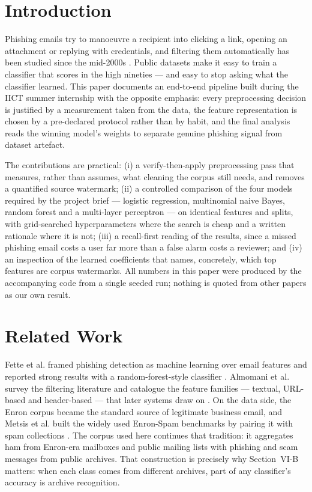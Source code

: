 \documentclass[conference]{IEEEtran}
\begin{document}
\section{Introduction}
Phishing emails try to manoeuvre a recipient into clicking a link,
opening an attachment or replying with credentials, and filtering them
automatically has been studied since the mid-2000s
\cite{fette2007,almomani2013}. Public datasets make it easy to train a
classifier that scores in the high nineties --- and easy to stop asking
what the classifier learned. This paper documents an end-to-end pipeline
built during the IICT summer internship with the opposite emphasis:
every preprocessing decision is justified by a measurement taken from
the data, the feature representation is chosen by a pre-declared
protocol rather than by habit, and the final analysis reads the winning
model's weights to separate genuine phishing signal from dataset
artefact.

The contributions are practical: (i) a verify-then-apply preprocessing
pass that measures, rather than assumes, what cleaning the corpus still
needs, and removes a quantified source watermark; (ii) a controlled
comparison of the four models required by the project brief --- logistic
regression, multinomial naive Bayes, random forest and a multi-layer
perceptron --- on identical features and splits, with grid-searched
hyperparameters where the search is cheap and a written rationale where
it is not; (iii) a recall-first reading of the results, since a missed
phishing email costs a user far more than a false alarm costs a
reviewer; and (iv) an inspection of the learned coefficients that names,
concretely, which top features are corpus watermarks. All numbers in
this paper were produced by the accompanying code from a single seeded
run; nothing is quoted from other papers as our own result.

\section{Related Work}
Fette et al. framed phishing detection as machine learning over email
features and reported strong results with a random-forest-style
classifier \cite{fette2007}. Almomani et al. survey the filtering
literature and catalogue the feature families --- textual, URL-based and
header-based --- that later systems draw on \cite{almomani2013}. On the
data side, the Enron corpus \cite{klimt2004} became the standard source
of legitimate business email, and Metsis et al. built the widely used
Enron-Spam benchmarks by pairing it with spam collections
\cite{metsis2006}. The corpus used here continues that tradition:
it aggregates ham from Enron-era mailboxes and public mailing lists with
phishing and scam messages from public archives. That construction is
precisely why Section~VI-B matters: when each class comes from different
archives, part of any classifier's accuracy is archive recognition.
\end{document}
